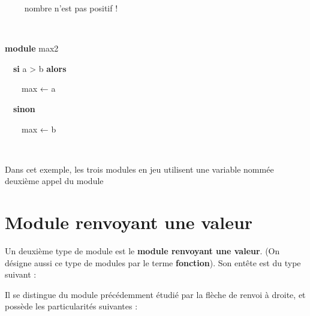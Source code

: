 {\sffamily
\ \ \ \  nombre
n'est pas positif !{\textquotedbl}}

{\sffamily
\ \ }

{\sffamily
{}}


\bigskip

{\sffamily
\textbf{module} max2}

{\sffamily
\ \ \textbf{si} a {\textgreater} b \textbf{alors}}

{\sffamily
\ \ \ \ max{ }{← a}}

{\sffamily
\ \ \textbf{sinon}}

{\sffamily
\ \ \ \ max{ }{← b}}

{\sffamily
\ \  }

{\sffamily
{}}

{
{Dans cet exemple, les trois modules en jeu
utilisent une variable nommée
}deuxième{ appel du module
}}

\section[Module renvoyant une valeur]{\bfseries Module renvoyant une
valeur}
{
{Un deuxième type de module est le
}{\textbf{module renvoyant une
valeur}}{. (On désigne aussi ce type de modules
par le terme
}{\textbf{fonction}}{).
Son entête est du type suivant :}}

{\sffamily
{}}

{
Il se distingue du module précédemment étudié par la flèche de renvoi à
droite, et possède les particularités suivantes :}

